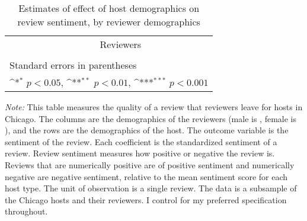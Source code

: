 \begin{landscape}
	\begin{table}[htbp]\centering
		\def\sym#1{\ifmmode^{#1}\else\(^{#1}\)\fi}
		\caption{Estimates of effect of host demographics on review sentiment, by reviewer demographics}
		\begin{tabular}{l *{8}{c}}
			\hline\hline
			&\multicolumn{8}{c}{Reviewers} \\
			\cmidrule(r){2-9}\\
				
			\hline\hline
			\multicolumn{9}{l}{\footnotesize Standard errors in parentheses}\\
			\multicolumn{9}{l}{\footnotesize \sym{*} \(p<0.05\), \sym{**} \(p<0.01\), \sym{***} \(p<0.001\)}\\
		\end{tabular}
	\label{table:sentiment}
	
		\begin{tablenotes}
			
			\item {\it Note:} This table measures the quality of a review that reviewers leave for hosts in Chicago. The columns are the demographics of the reviewers (male is , female is ), and the rows are the demographics of the host. The outcome variable is the sentiment of the review. Each coefficient is the standardized sentiment of a review. Review sentiment measures how positive or negative the review is. Reviews that are numerically positive are of positive sentiment and numerically negative are negative sentiment, relative to the mean sentiment score for each host type. The unit of observation is a single review. The data is a subsample of the Chicago hosts and their reviewers. I control for my preferred specification throughout. 
			
		\end{tablenotes}
		
	\end{table}
\end{landscape}

